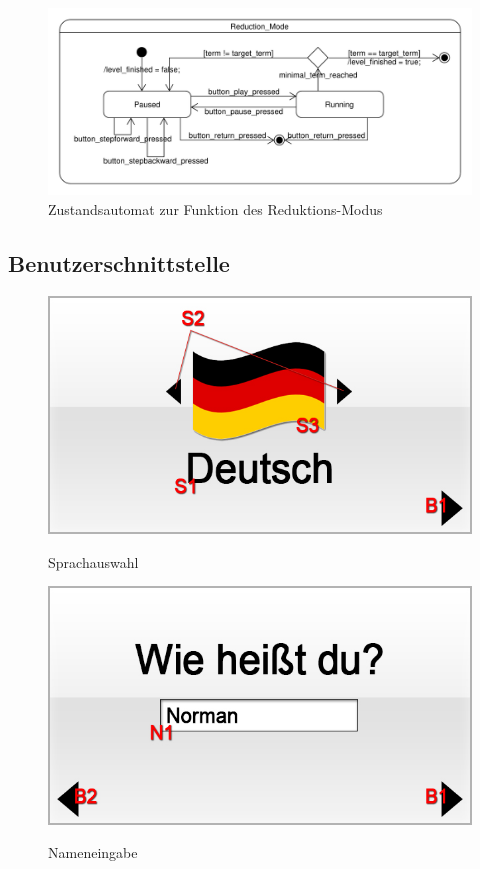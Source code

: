 \begin{figure}[H]
\centering
\includegraphics[scale=0.55]{../system_models/dynamic_models/reduction_mode_state_machine.pdf}
\caption{Zustandsautomat zur Funktion des Reduktions-Modus}
\end{figure}

\subsection{Benutzerschnittstelle}
\begin{figure}[H]

\centering
{}\label{fig:Sprachauswahl}
\includegraphics[scale=0.55]{../GUI-Entwurf/_jpeg_numeration/registration1.jpg}

\caption{Sprachauswahl}


\end{figure}

\begin{figure}[H]
\centering
{}\label{fig:Nameneingabe} 
\includegraphics[scale=0.55]
{../GUI-Entwurf/_jpeg_numeration/registration2.jpg}
\caption{Nameneingabe}
\end{figure}

